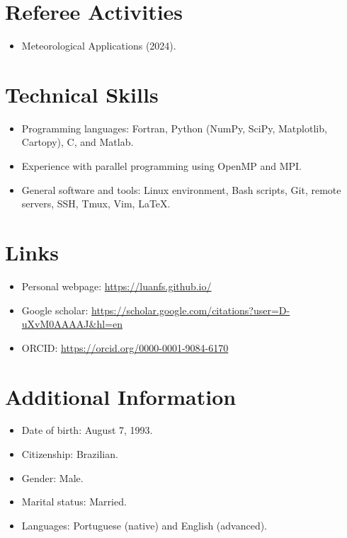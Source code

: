 \documentclass[letterpaper,11pt]{article}
\begin{document}
 
\section{Referee Activities}
\begin{itemize}
	\item Meteorological Applications (2024).
\end{itemize}

%
\section{Technical Skills}
\begin{itemize}
	\item Programming languages: Fortran, Python (NumPy, SciPy, Matplotlib, Cartopy), C, and Matlab.
	\item Experience with parallel programming using OpenMP and MPI.
	\item General software and tools: Linux environment, Bash scripts, Git, remote servers, SSH, Tmux, Vim, \LaTeX.
\end{itemize}


%
\section{Links}
\begin{itemize}
	\item Personal webpage:  \href{https://luanfs.github.io/}{https://luanfs.github.io/}
	\item Google scholar: \href{https://scholar.google.com/citations?user=D-uXvM0AAAAJ&hl=en}{https://scholar.google.com/citations?user=D-uXvM0AAAAJ\&hl=en}
	\item ORCID:  \href{https://orcid.org/0000-0001-9084-6170}{https://orcid.org/0000-0001-9084-6170}
\end{itemize}


\section{Additional Information}
\begin{itemize}
	\item Date of birth: August 7, 1993.
	\item Citizenship: Brazilian.
	\item Gender: Male.
	\item Marital status: Married.
	\item Languages: Portuguese (native) and English (advanced).
\end{itemize}




\end{document}
